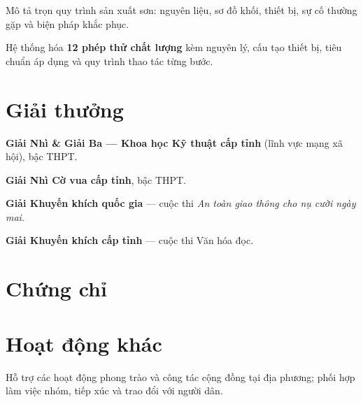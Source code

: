 \documentclass[vietnamese]{cvclassic}
\begin{document}
\begin{cvitems}
  \item Mô tả trọn quy trình sản xuất sơn: nguyên liệu, sơ đồ khối, thiết bị, sự cố thường gặp và biện pháp khắc phục.
  \item Hệ thống hóa \textbf{12 phép thử chất lượng} kèm nguyên lý, cấu tạo thiết bị, tiêu chuẩn áp dụng và quy trình thao tác từng bước.
\end{cvitems}

\section{Giải thưởng}
\begin{cvitems}
  \item \textbf{Giải Nhì \& Giải Ba --- Khoa học Kỹ thuật cấp tỉnh} (lĩnh vực mạng xã hội), bậc THPT.
  \item \textbf{Giải Nhì Cờ vua cấp tỉnh}, bậc THPT.
  \item \textbf{Giải Khuyến khích quốc gia} --- cuộc thi \textit{An toàn giao thông cho nụ cười ngày mai}.
  \item \textbf{Giải Khuyến khích cấp tỉnh} --- cuộc thi Văn hóa đọc.
\end{cvitems}

\section{Chứng chỉ}
\begin{cvfields}[.25\linewidth]
\end{cvfields}

\section{Hoạt động khác}
\begin{cvitems}
  \item Hỗ trợ các hoạt động phong trào và công tác cộng đồng tại địa phương; phối hợp làm việc nhóm, tiếp xúc và trao đổi với người dân.
\end{cvitems}
\end{document}
